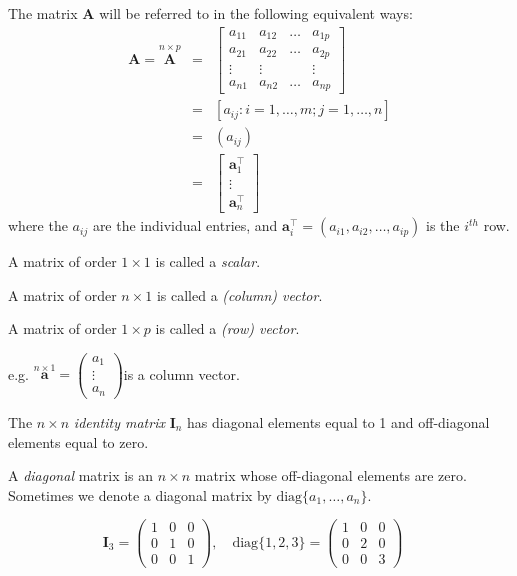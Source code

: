 \documentclass[]{book}
\theoremstyle{definition}
\theoremstyle{definition}
\theoremstyle{definition}
\theoremstyle{remark}
\begin{document}
The matrix \({\mathbf A}\) will be referred to in the following equivalent ways:
\begin{eqnarray*}
{\mathbf A}=\stackrel{n\times p}{\mathbf A} &=& \left[\begin{array}{cccc}
a_{11}&a_{12}&\dots&a_{1p}\\
a_{21}&a_{22}&\dots&a_{2p}\\
\vdots&\vdots&&\vdots\\
a_{n1}&a_{n2}&\dots&a_{np}
\end{array} \right] \\
&=&[a_{ij}: i=1, \ldots , m; j=1, \ldots , n]\\
&=&(a_{ij})\\
&=& \left[ \begin{array}{c}\boldsymbol a_1^\top\\
\vdots\\
\boldsymbol a_n^\top\end{array}\right]
\end{eqnarray*}
where the \(a_{ij}\) are the individual entries, and \(\boldsymbol a_i^\top=(a_{i1}, a_{i2}, \ldots, a_{ip})\) is the \(i^{th}\) row.

A matrix of order \(1\times 1\) is called a \emph{scalar}.

A matrix of order \(n\times 1\) is called a \emph{(column) vector}.

A matrix of order \(1\times p\) is called a \emph{(row) vector}.

e.g. \(\stackrel{n\times 1}{\mathbf a}=\left( \begin{array}{c} a_1\\\vdots\\a_n \end{array} \right)\)\quad is a column vector.

The \(n\times n\) \emph{identity matrix} \({\mathbf I}_n\) has diagonal elements equal to 1
and off-diagonal elements equal to zero.

A \emph{diagonal} matrix is an \(n \times n\) matrix whose
off-diagonal elements are zero. Sometimes we denote a diagonal
matrix by \(\text{diag}\{a_1,\ldots, a_n\}\).

\[\mathbf I_3 = \left(\begin{array}{ccc} 1&0&0\\ 0&1&0\\ 0&0&1\end{array}\right),\quad \text{diag}\{1,2,3\}=\left(\begin{array}{ccc} 1&0&0\\ 0&2&0\\ 0&0&3\end{array}\right)\quad\]
\end{document}
